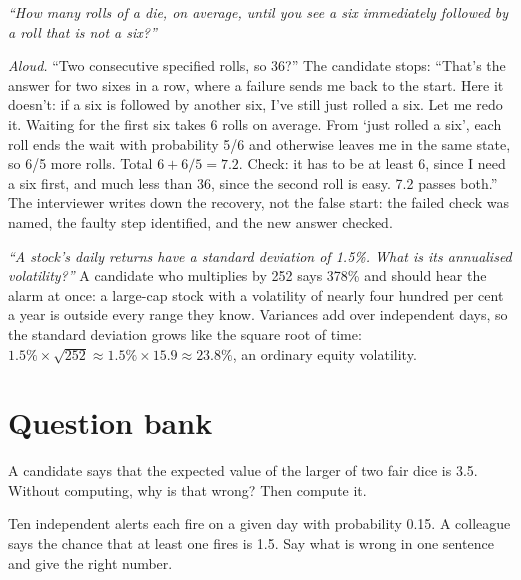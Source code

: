 \begin{example}\label{ex:iv:phone-and-technical-screens:recover}
\emph{``How many rolls of a die, on average, until you see a six immediately followed by a roll that is not a six?''}

\emph{Aloud.} ``Two consecutive specified rolls, so 36?'' The candidate stops: ``That's the answer for two sixes in a
row, where a failure sends me back to the start. Here it doesn't: if a six is followed by another six, I've still just
rolled a six. Let me redo it. Waiting for the first six takes 6 rolls on average. From `just rolled a six', each roll ends
the wait with probability 5/6 and otherwise leaves me in the same state, so 6/5 more rolls. Total $6 + 6/5 = 7.2$.
Check: it has to be at least 6, since I need a six first, and much less than 36, since the second roll is easy. 7.2
passes both.'' The interviewer writes down the recovery, not the false start: the failed check was named, the faulty step
identified, and the new answer checked.
\end{example}

\begin{example}\label{ex:iv:phone-and-technical-screens:units}
\emph{``A stock's daily returns have a standard deviation of 1.5\%. What is its annualised volatility?''} A candidate who
multiplies by 252 says 378\% and should hear the alarm at once: a large-cap stock with a volatility of nearly four
hundred per cent a year is outside every range they know. Variances add over independent days, so the standard deviation
grows like the square root of time: $1.5\% \times \sqrt{252} \approx 1.5\% \times 15.9 \approx 23.8\%$, an ordinary
equity volatility.
\end{example}

\section{Question bank}

\begin{interviewq}\label{iq:iv:phone-and-technical-screens:1}
A candidate says that the expected value of the larger of two fair dice is 3.5. Without computing, why is that
wrong? Then compute it.
\end{interviewq}

\begin{interviewq}\label{iq:iv:phone-and-technical-screens:2}
Ten independent alerts each fire on a given day with probability 0.15. A colleague says the chance that at
least one fires is 1.5. Say what is wrong in one sentence and give the right number.
\end{interviewq}

